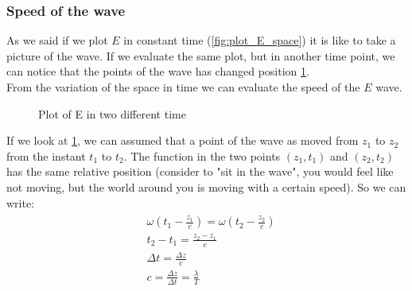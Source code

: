 \subsubsection*{Speed of the wave}
As we said if we plot $E$ in constant time (\cref{fig:plot_E_space}) it is like to take a picture of the wave. If we evaluate the same plot, but in another time point, we can notice that the points of the wave has changed position \cref{fig:plot_E_variation}.\\
From the variation of the space in time we can evaluate the speed of the $E$ wave.
\begin{figure}[H]
    \begin{center}
    \end{center}
    \caption{Plot of E in two different time}\label{fig:plot_E_variation}
\end{figure}
If we look at \cref{fig:plot_E_variation}, we can assumed that a point of the wave as moved from $z_1$ to $z_2$ from the instant $t_1$ to $t_2$. The function in the two points $(z_1,t_1)$ and $(z_2,t_2)$ has the same relative position (consider to "sit in the wave", you would feel like not moving, but the world around you is moving with a certain speed). So we can write:
\begin{align}
    \begin{split}
        &\omega\left(t_1-\frac{z_1}{c}\right)=\omega\left(t_2-\frac{z_2}{c}\right)\\[5pt]
        &t_2-t_1=\frac{z_2-z_1}{c}\\[5pt]
        &\Delta t= \frac{\Delta z}{c}\\[5pt]
        &c=\frac{\Delta z}{\Delta t}=\frac{\lambda}{T}
    \end{split}
\end{align}
